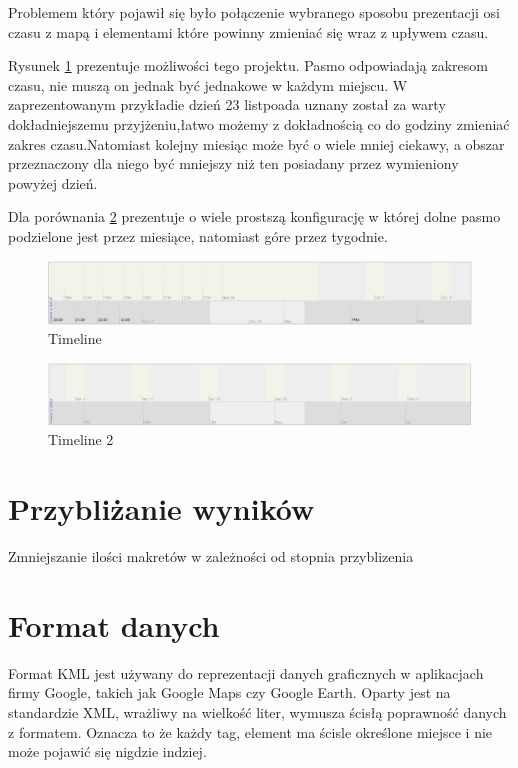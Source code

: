 Problemem który pojawił się było połączenie wybranego sposobu prezentacji osi czasu z mapą i elementami które powinny zmieniać się wraz z upływem czasu.

Rysunek \ref{fig:tm1} prezentuje możliwości tego projektu. Pasmo odpowiadają zakresom czasu, nie muszą on jednak być jednakowe w każdym miejscu. W zaprezentowanym przykładie dzień 23 listpoada uznany został za warty dokładniejszemu przyjżeniu,łatwo możemy z dokładnością co do godziny zmieniać zakres czasu.Natomiast kolejny miesiąc może być o wiele mniej ciekawy, a obszar przeznaczony dla niego być mniejszy niż ten posiadany przez wymieniony powyżej dzień.

Dla porównania \ref{fig:tm2} prezentuje o wiele prostszą konfigurację w której dolne pasmo podzielone jest przez miesiące, natomiast góre przez tygodnie.

  \begin{figure}[H]
  \centering
    \includegraphics[width=150mm]{ge/tm1.jpg}
  \caption{Timeline}
  \label{fig:tm1}
\end{figure}

  \begin{figure}[H]
  \centering
    \includegraphics[width=150mm]{ge/tm2.jpg}
  \caption{Timeline 2}
  \label{fig:tm2}
\end{figure}
\section{Przybliżanie wyników}
\label{sec:przyblizanie}

Zmniejszanie ilości makretów w zależności od stopnia przyblizenia


\section{Format danych}
\label{sec:dataformat}



Format KML jest używany do reprezentacji danych graficznych w aplikacjach firmy Google, takich jak Google Maps czy Google Earth. Oparty jest na standardzie XML, wrażliwy na wielkość liter, wymusza ścisłą poprawność danych z formatem. Oznacza to że każdy tag, element ma ścisle określone miejsce i nie może pojawić się nigdzie indziej.


